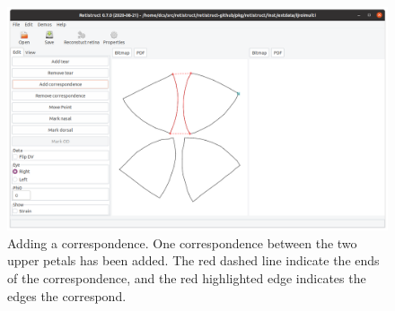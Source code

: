 \documentclass{book}
\begin{document}
\begin{figure}
  \includegraphics[width=\linewidth]{correspondence}
  \caption{Adding a correspondence. One correspondence between the two
    upper petals has been added. The red dashed line indicate the ends
    of the correspondence, and the red highlighted edge indicates the
    edges the correspond.}
  \label{retistruct-user-guide:fig:correspondence}
\end{figure}
\end{document}

